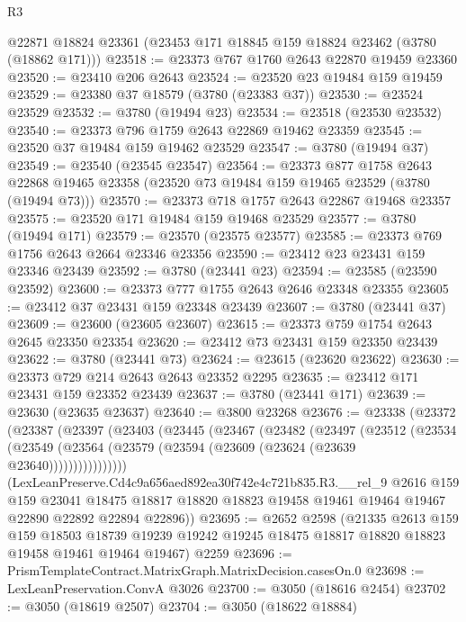 \begin{lexlean}{R3}
\begin{coremodule}
    @22871
    @18824
    @23361
    (@23453 @171 @18845 @159 @18824 @23462 (@3780 (@18862 @171)))
@23518 := @23373 @767 @1760 @2643 @22870 @19459 @23360
@23520 := @23410 @206 @2643
@23524 := @23520 @23 @19484 @159 @19459
@23529 := @23380 @37 @18579 (@3780 (@23383 @37))
@23530 := @23524 @23529
@23532 := @3780 (@19494 @23)
@23534 := @23518 (@23530 @23532)
@23540 := @23373 @796 @1759 @2643 @22869 @19462 @23359
@23545 := @23520 @37 @19484 @159 @19462 @23529
@23547 := @3780 (@19494 @37)
@23549 := @23540 (@23545 @23547)
@23564 := @23373
    @877
    @1758
    @2643
    @22868
    @19465
    @23358
    (@23520 @73 @19484 @159 @19465 @23529 (@3780 (@19494 @73)))
@23570 := @23373 @718 @1757 @2643 @22867 @19468 @23357
@23575 := @23520 @171 @19484 @159 @19468 @23529
@23577 := @3780 (@19494 @171)
@23579 := @23570 (@23575 @23577)
@23585 := @23373 @769 @1756 @2643 @2664 @23346 @23356
@23590 := @23412 @23 @23431 @159 @23346 @23439
@23592 := @3780 (@23441 @23)
@23594 := @23585 (@23590 @23592)
@23600 := @23373 @777 @1755 @2643 @2646 @23348 @23355
@23605 := @23412 @37 @23431 @159 @23348 @23439
@23607 := @3780 (@23441 @37)
@23609 := @23600 (@23605 @23607)
@23615 := @23373 @759 @1754 @2643 @2645 @23350 @23354
@23620 := @23412 @73 @23431 @159 @23350 @23439
@23622 := @3780 (@23441 @73)
@23624 := @23615 (@23620 @23622)
@23630 := @23373 @729 @214 @2643 @2643 @23352 @2295
@23635 := @23412 @171 @23431 @159 @23352 @23439
@23637 := @3780 (@23441 @171)
@23639 := @23630 (@23635 @23637)
@23640 := @3800 @23268
@23676 := @23338
    (@23372
      (@23387
        (@23397
          (@23403
            (@23445
              (@23467
                (@23482
                  (@23497
                    (@23512
                      (@23534
                        (@23549
                          (@23564 (@23579 (@23594 (@23609 (@23624 (@23639 @23640))))))))))))))))
      (LexLeanPreserve.Cd4c9a656aed892ea30f742e4c721b835.R3.__rel_9
        @2616
        @159
        @159
        @23041
        @18475
        @18817
        @18820
        @18823
        @19458
        @19461
        @19464
        @19467
        @22890
        @22892
        @22894
        @22896))
@23695 := @2652
    @2598
    (@21335
      @2613
      @159
      @159
      @18503
      @18739
      @19239
      @19242
      @19245
      @18475
      @18817
      @18820
      @18823
      @19458
      @19461
      @19464
      @19467)
    @2259
@23696 := PrismTemplateContract.MatrixGraph.MatrixDecision.casesOn.{0}
@23698 := LexLeanPreservation.ConvA @3026
@23700 := @3050 (@18616 @2454)
@23702 := @3050 (@18619 @2507)
@23704 := @3050 (@18622 @18884)

\end{coremodule}
\end{lexlean}
